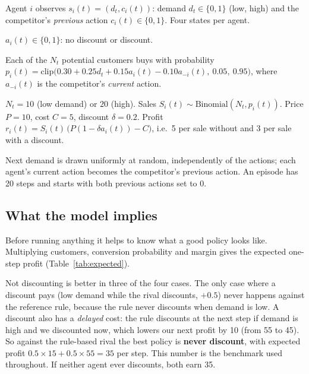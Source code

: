\documentclass[11pt, a4paper]{article}
\newcommand{\restable}[1]{}
\newcommand{\code}[1]{\texttt{#1}}
\begin{document}
\begin{description}[leftmargin=0pt]
    \item[State.] Agent $i$ observes $s_i(t) = (d_t, c_i(t))$: demand $d_t \in \{0, 1\}$ (low, high) and the competitor's \emph{previous} action $c_i(t) \in \{0, 1\}$. Four states per agent.
    \item[Action.] $a_i(t) \in \{0, 1\}$: no discount or discount.
    \item[Conversion.] Each of the $N_t$ potential customers buys with probability
    $p_i(t) = \mathrm{clip}\big(0.30 + 0.25 d_t + 0.15 a_i(t) - 0.10 a_{-i}(t),\ 0.05,\ 0.95\big)$, where $a_{-i}(t)$ is the competitor's \emph{current} action.
    \item[Reward.] $N_t = 10$ (low demand) or $20$ (high). Sales $S_i(t) \sim \mathrm{Binomial}(N_t, p_i(t))$. Price $P=10$, cost $C=5$, discount $\delta = 0.2$. Profit $r_i(t) = S_i(t)\,\big(P(1-\delta a_i(t)) - C\big)$, i.e.\ 5 per sale without and 3 per sale with a discount.
    \item[Transition.] Next demand is drawn uniformly at random, independently of the actions; each agent's current action becomes the competitor's previous action. An episode has 20 steps and starts with both previous actions set to 0.
\end{description}

\subsection{What the model implies}

Before running anything it helps to know what a good policy looks like. Multiplying customers, conversion probability and margin gives the expected one-step profit (Table~\ref{tab:expected}).

\begin{table}[H]
\centering
\caption{Expected one-step profit $E[r] = N_t\, p_i\, (\text{margin})$ for every demand level and competitor action (computed by \code{expected\_profit}).}
\label{tab:expected}
\restable{expected_profit.tex}
\end{table}

Not discounting is better in three of the four cases. The only case where a discount pays (low demand while the rival discounts, $+0.5$) never happens against the reference rule, because the rule never discounts when demand is low. A discount also has a \emph{delayed} cost: the rule discounts at the next step if demand is high and we discounted now, which lowers our next profit by 10 (from 55 to 45). So against the rule-based rival the best policy is \textbf{never discount}, with expected profit $0.5 \times 15 + 0.5 \times 55 = 35$ per step. This number is the benchmark used throughout. If neither agent ever discounts, both earn 35.
\end{document}

